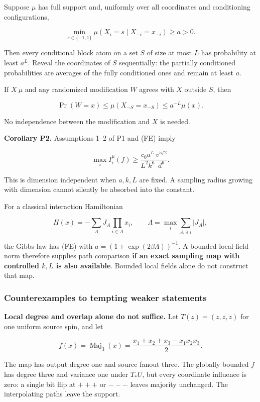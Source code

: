 Suppose \(\mu\) has full support and, uniformly over all coordinates and
conditioning configurations,

\[
\min_{s\in\{-1,1\}}\mu(X_i=s\mid X_{-i}=x_{-i})\ge a>0.
\tag{FE}
\]

Then every conditional block atom on a set \(S\) of size at most \(L\)
has probability at least \(a^L\). Reveal the coordinates of \(S\)
sequentially: the partially conditioned probabilities are averages of
the fully conditioned ones and remain at least \(a\).

If \(X~\mu\) and any randomized modification \(W\) agrees with \(X\)
outside \(S\), then

\[
\Pr(W=x)\le\mu(X_{-S}=x_{-S})\le a^{-L}\mu(x).
\]

No independence between the modification and \(X\) is needed.

\textbf{Corollary P2.} Assumptions 1--2 of P1 and (FE) imply

\[
\boxed{\max_i I_i^\mu(f)
\ge \frac{c_0a^L}{L^2k^6}\frac{v^{5/2}}{d^6}.}
\tag{P2}
\]

This is dimension independent when \(a,k,L\) are fixed. A sampling
radius growing with dimension cannot silently be absorbed into the
constant.

For a classical interaction Hamiltonian

\[
H(x)=-\sum_A J_A\prod_{i\in A}x_i,
\qquad\Lambda=\max_i\sum_{A\ni i}|J_A|,
\]

the Gibbs law has (FE) with \(a=(1+\exp (2 \beta \Lambda))^{-1}\). A
bounded local-field norm therefore supplies path comparison \textbf{if
an exact sampling map with controlled \(k,L\) is also available}.
Bounded local fields alone do not construct that map.

\subsubsection{Counterexamples to tempting weaker
statements}\label{proof:positive_structure:counterexamples-to-tempting-weaker-statements}

\textbf{Local degree and overlap alone do not suffice.} Let
\(T(z)=(z,z,z)\) for one uniform source spin, and let

\[
f(x)=\operatorname{Maj}_3(x)=\frac{x_1+x_2+x_3-x_1x_2x_3}{2}.
\]

The map has output degree one and source fanout three. The globally
bounded \(f\) has degree three and variance one under \(T_*U\), but
every coordinate influence is zero: a single bit flip at \(+++\) or
\(---\) leaves majority unchanged. The interpolating paths leave the
support.


